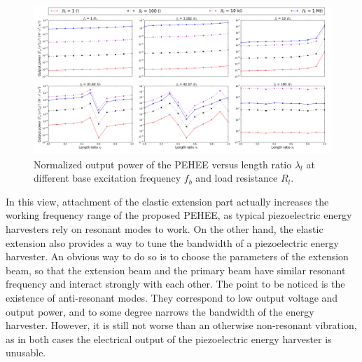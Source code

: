 \documentclass{elsarticle}
\begin{document}
\begin{figure}[!htbp]
    \centering
    \includegraphics[width=\textwidth]{./fig_pow_fr_sl_Rl_sl_vs_laml}
    \caption{ Normalized output power of the PEHEE versus length ratio $\lambda_l$ at different base excitation frequency $f_b$ and load resistance $R_l$. }
    \label{fig:fig_pow_fr_sl_Rl_sl_vs_laml}
\end{figure}

In this view, attachment of the elastic extension part actually increases the working frequency range of the proposed PEHEE, as typical piezoelectric energy harvesters rely on resonant modes to work. On the other hand, the elastic extension also provides a way to tune the bandwidth of a piezoelectric energy harvester. An obvious way to do so is to choose the parameters of the extension beam, so that the extension beam and the primary beam have similar resonant frequency and interact strongly with each other. The point to be noticed is the existence of anti-resonant modes. They correspond to low output voltage and output power, and to some degree narrows the bandwidth of the energy harvester. However, it is still not worse than an otherwise non-resonant vibration, as in both cases the electrical output of the piezoelectric energy harvester is unusable.
\end{document}
